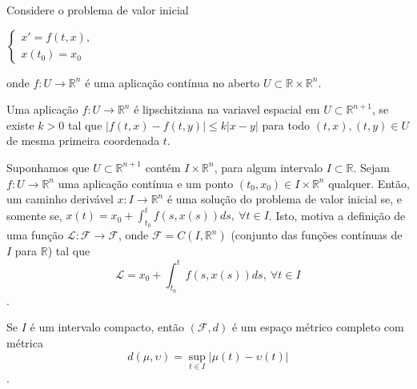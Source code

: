 \documentclass[a4paper, 12pt]{article}
\renewcommand{\Bbb}{\mathbb}
\begin{document}
Considere o problema de valor inicial 
\begin{center}$\begin{cases}
x'=f(t,x),\\ x(t_0)=x_0
\end{cases}$\end{center}
onde $f:U\to \Bbb R^n$ é uma aplicação contínua no aberto $U \subset \Bbb R \times \Bbb R^n$.

Uma aplicação $f:U\to \Bbb R^n$ é lipschitziana na variavel espacial em $U \subset \Bbb R^{n+1}$, se existe $k > 0$ tal que $|f(t,x)-f(t,y)| \leq k|x-y|$ para todo $(t,x),(t,y)\in U$ de mesma primeira coordenada $t$.

Suponhamos que $U\subset \Bbb R^{n+1}$ contém $I\times \Bbb R^n$, para algum intervalo $I\subset \Bbb R$. Sejam $f:U\to \Bbb R^n$ uma aplicação contínua e um ponto $(t_0,x_0) \in I\times \Bbb R^n$ qualquer. Então, um caminho derivável $x:I\to \Bbb R^n$ é uma solução do problema de valor inicial se, e somente se, $x(t) = x_0 + \int^t_{t_0} f(s,x(s))ds,\ \forall t\in I$.
Isto, motiva a definição de uma função $\mathcal L: \mathcal F\to \mathcal F$, onde $\mathcal F = C(I,\Bbb R^n)$ (conjunto das funções contínuas de $I$ para $\Bbb R$) tal que $$\mathcal L = x_0 + \int^t_{t_0} f(s,x(s))ds,\ \forall t \in I$$.

Se $I$ é um intervalo compacto, então $(\mathcal F, d)$ é um espaço métrico completo com métrica $$d(\mu,\upsilon) = \sup_{t\in I} |\mu(t) - \upsilon(t)|$$.
\end{document}
